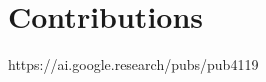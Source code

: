 \documentclass[twoside,twocolumn]{article}
\begin{document}
\section{Contributions}




\begin{thebibliography}{99} %


https://ai.google.research/pubs/pub4119

\end{thebibliography}

\end{document}
